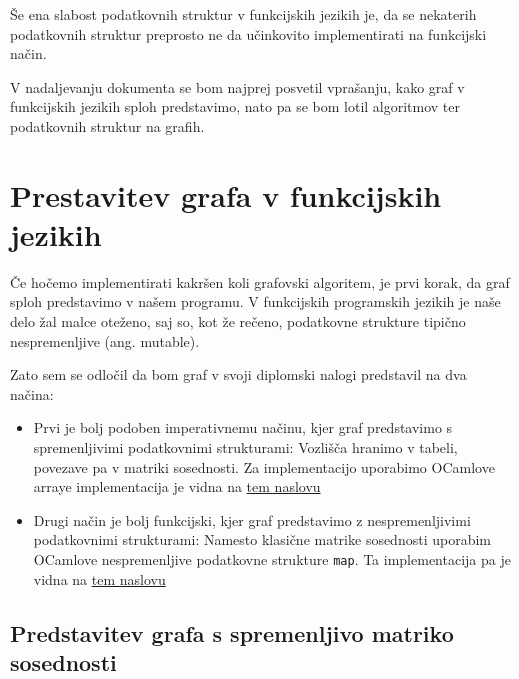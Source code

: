\documentclass[mat1, tisk]{fmfdelo}
\begin{document}
Še ena slabost podatkovnih struktur v funkcijskih jezikih je, da se nekaterih podatkovnih struktur preprosto ne da učinkovito implementirati na funkcijski način.

V nadaljevanju dokumenta se bom najprej posvetil vprašanju, kako graf v funkcijskih jezikih sploh predstavimo, nato pa se bom lotil algoritmov ter podatkovnih struktur na grafih.


\section{Prestavitev grafa v funkcijskih jezikih}

Če hočemo implementirati kakršen koli grafovski algoritem, je prvi korak, da graf sploh predstavimo v našem programu. V funkcijskih programskih jezikih je naše delo žal
malce oteženo, saj so, kot že rečeno, podatkovne strukture tipično nespremenljive (ang. mutable).

Zato sem se odločil da bom graf v svoji diplomski nalogi predstavil na dva načina:
\begin{itemize}
  \item Prvi je bolj podoben imperativnemu načinu, kjer graf predstavimo s spremenljivimi podatkovnimi strukturami: Vozlišča hranimo v tabeli, povezave pa v matriki sosednosti.
        Za implementacijo uporabimo OCamlove arraye implementacija je vidna na 
        \href{https://github.com/tjazerzen/parallelisation-of-graph-algorithms-in-functional-programming-languages/blob/predstavitev_grafa_z_arrayi_ter_mnozicami/playground/graph/graph.ml}{tem naslovu}
  \item Drugi način je bolj funkcijski, kjer graf predstavimo z nespremenljivimi podatkovnimi strukturami: Namesto klasične matrike sosednosti uporabim OCamlove nespremenljive
        podatkovne strukture \texttt{map}. Ta implementacija pa je vidna na
        \href{https://github.com/tjazerzen/parallelisation-of-graph-algorithms-in-functional-programming-languages/blob/master/playground/graph/graph.ml}{tem naslovu}
\end{itemize}

\subsection{Predstavitev grafa s spremenljivo matriko sosednosti} \label{sec:predstavitev_grafa_s_spremenljivo_matriko_sosednosti}
\end{document}
